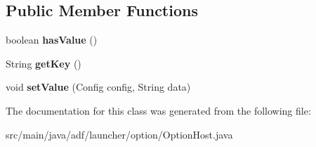 \subsection*{Public Member Functions}
\begin{DoxyCompactItemize}
\item 
\hypertarget{classadf_1_1launcher_1_1option_1_1OptionHost_abb42f49a819b9889ecaf165a78bbedc3}{}\label{classadf_1_1launcher_1_1option_1_1OptionHost_abb42f49a819b9889ecaf165a78bbedc3} 
boolean {\bfseries has\+Value} ()
\item 
\hypertarget{classadf_1_1launcher_1_1option_1_1OptionHost_a5b7e227657faf11c255472d983064fb3}{}\label{classadf_1_1launcher_1_1option_1_1OptionHost_a5b7e227657faf11c255472d983064fb3} 
String {\bfseries get\+Key} ()
\item 
\hypertarget{classadf_1_1launcher_1_1option_1_1OptionHost_ab98aa7285b91fcbc29e9db7959a46604}{}\label{classadf_1_1launcher_1_1option_1_1OptionHost_ab98aa7285b91fcbc29e9db7959a46604} 
void {\bfseries set\+Value} (Config config, String data)
\end{DoxyCompactItemize}


The documentation for this class was generated from the following file\+:\begin{DoxyCompactItemize}
\item 
src/main/java/adf/launcher/option/Option\+Host.\+java\end{DoxyCompactItemize}
